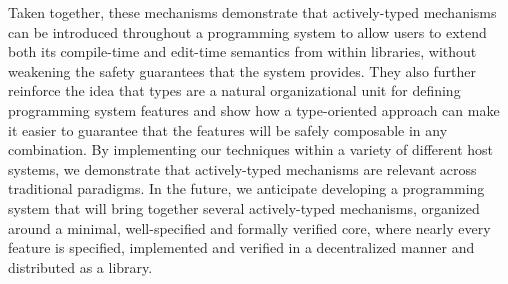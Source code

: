 Taken together, these mechanisms demonstrate that actively-typed mechanisms can be introduced throughout a programming system to allow users to extend both its compile-time and edit-time semantics from within libraries, without  weakening the safety guarantees that the system provides. They also further reinforce the idea that types are a natural organizational unit for defining programming system features and show how a type-oriented approach can make it easier to guarantee that the features will be safely composable in any combination. By implementing our techniques within a variety of different host systems, we demonstrate that actively-typed mechanisms are relevant across traditional paradigms. In the future, we anticipate developing a programming system that will bring together several actively-typed mechanisms, organized around a minimal, well-specified and formally verified core, where nearly every feature is specified, implemented and verified in a decentralized manner and distributed as a library. 

